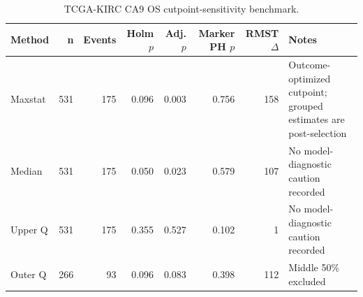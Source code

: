 \begin{table}[t]
\centering
\caption{TCGA-KIRC CA9 OS cutpoint-sensitivity benchmark.}
\label{tab:kirc-ca9-cutpoints}
\begin{tabular}{lrrrrrrl}
\toprule
Method & n & Events & Holm $p$ & Adj. $p$ & Marker PH $p$ & RMST $\Delta$ & Notes \\
\midrule
Maxstat & 531 & 175 & 0.096 & 0.003 & 0.756 & 158 & Outcome-optimized cutpoint; grouped estimates are post-selection \\
Median & 531 & 175 & 0.050 & 0.023 & 0.579 & 107 & No model-diagnostic caution recorded \\
Upper Q & 531 & 175 & 0.355 & 0.527 & 0.102 & 1 & No model-diagnostic caution recorded \\
Outer Q & 266 & 93 & 0.096 & 0.083 & 0.398 & 112 & Middle 50\% excluded \\
\bottomrule
\end{tabular}
\end{table}
